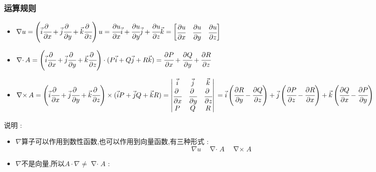 \documentclass[UTF8,12pt]{ctexbook}
\newcommand{\bigCase}[1]{\left(#1\right)}
\newcommand{\partialDerivativeFrac}[2]{\cfrac{\partial #1}{\partial #2}}
\DeclareMathOperator{\divergenceSymbol}{\nabla\cdot}
\DeclareMathOperator{\curlSymbol}{\nabla\times}
\begin{document}
{{{{    \subsubsection{运算规则}{
      \begin{itemize}
        \item $\nabla u = \bigCase{\vec{i}\partialDerivativeFrac{\ }{x} + \vec{j}\partialDerivativeFrac{\ }{y} + \vec{k}\partialDerivativeFrac{\ }{z}}u = \partialDerivativeFrac{u}{x}\vec{i} + \partialDerivativeFrac{u}{y}\vec{j} + \partialDerivativeFrac{u}{z}\vec{k} = \begin{bmatrix}
                  \partialDerivativeFrac{u}{x} & \partialDerivativeFrac{u}{y} & \partialDerivativeFrac{u}{z}
                \end{bmatrix}$
        \item $\divergenceSymbol A = \bigCase{\vec{i}\partialDerivativeFrac{\ }{x} + \vec{j}\partialDerivativeFrac{\ }{y} + \vec{k}\partialDerivativeFrac{\ }{z}} \cdot (P\vec{i} + Q\vec{j} + R\vec{k}) = \partialDerivativeFrac{P}{x} + \partialDerivativeFrac{Q}{y} + \partialDerivativeFrac{R}{z}$
        \item $\curlSymbol A = \bigCase{\vec{i}\partialDerivativeFrac{\ }{x} + \vec{j}\partialDerivativeFrac{\ }{y} + \vec{k}\partialDerivativeFrac{\ }{z}} \times (\vec{i}P + \vec{j}Q + \vec{k}R) = \begin{vmatrix}
                  \vec{i}                       & \vec{j}                       & \vec{k}                       \\
                  \partialDerivativeFrac{\ }{x} & \partialDerivativeFrac{\ }{y} & \partialDerivativeFrac{\ }{z} \\
                  P                             & Q                             & R
                \end{vmatrix}\\
                = \vec{i}\bigCase{\partialDerivativeFrac{R}{y} - \partialDerivativeFrac{Q}{z}} + \vec{j}\bigCase{\partialDerivativeFrac{P}{z} - \partialDerivativeFrac{R}{x}} + \vec{k}\bigCase{\partialDerivativeFrac{Q}{x} - \partialDerivativeFrac{P}{y}}$
      \end{itemize}

      说明 :
      \begin{itemize}
        \item {
              $\nabla$算子可以作用到数性函数,也可以作用到向量函数,有三种形式 : $$
                \nabla u \quad \divergenceSymbol A \quad \curlSymbol A
              $$
              }
        \item {
              $\nabla$不是向量,所以$A \cdot \nabla \neq \divergenceSymbol A$ :

}
\end{itemize}}}}}}
\end{document}
